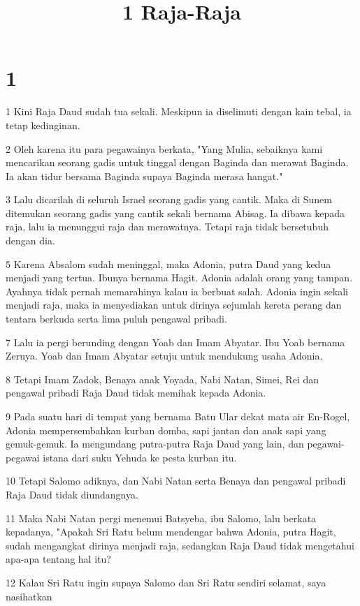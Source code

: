 

\title{1 Raja-Raja}


\chapter{1}

\par 1 Kini Raja Daud sudah tua sekali. Meskipun ia diselimuti dengan kain tebal, ia tetap kedinginan.
\par 2 Oleh karena itu para pegawainya berkata, "Yang Mulia, sebaiknya kami mencarikan seorang gadis untuk tinggal dengan Baginda dan merawat Baginda. Ia akan tidur bersama Baginda supaya Baginda merasa hangat."
\par 3 Lalu dicarilah di seluruh Israel seorang gadis yang cantik. Maka di Sunem ditemukan seorang gadis yang cantik sekali bernama Abisag. Ia dibawa kepada raja, lalu ia menunggui raja dan merawatnya. Tetapi raja tidak bersetubuh dengan dia.
\par 5 Karena Absalom sudah meninggal, maka Adonia, putra Daud yang kedua menjadi yang tertua. Ibunya bernama Hagit. Adonia adalah orang yang tampan. Ayahnya tidak pernah memarahinya kalau ia berbuat salah. Adonia ingin sekali menjadi raja, maka ia menyediakan untuk dirinya sejumlah kereta perang dan tentara berkuda serta lima puluh pengawal pribadi.
\par 7 Lalu ia pergi berunding dengan Yoab dan Imam Abyatar. Ibu Yoab bernama Zeruya. Yoab dan Imam Abyatar setuju untuk mendukung usaha Adonia.
\par 8 Tetapi Imam Zadok, Benaya anak Yoyada, Nabi Natan, Simei, Rei dan pengawal pribadi Raja Daud tidak memihak kepada Adonia.
\par 9 Pada suatu hari di tempat yang bernama Batu Ular dekat mata air En-Rogel, Adonia mempersembahkan kurban domba, sapi jantan dan anak sapi yang gemuk-gemuk. Ia mengundang putra-putra Raja Daud yang lain, dan pegawai-pegawai istana dari suku Yehuda ke pesta kurban itu.
\par 10 Tetapi Salomo adiknya, dan Nabi Natan serta Benaya dan pengawal pribadi Raja Daud tidak diundangnya.
\par 11 Maka Nabi Natan pergi menemui Batsyeba, ibu Salomo, lalu berkata kepadanya, "Apakah Sri Ratu belum mendengar bahwa Adonia, putra Hagit, sudah mengangkat dirinya menjadi raja, sedangkan Raja Daud tidak mengetahui apa-apa tentang hal itu?
\par 12 Kalau Sri Ratu ingin supaya Salomo dan Sri Ratu sendiri selamat, saya nasihatkan
